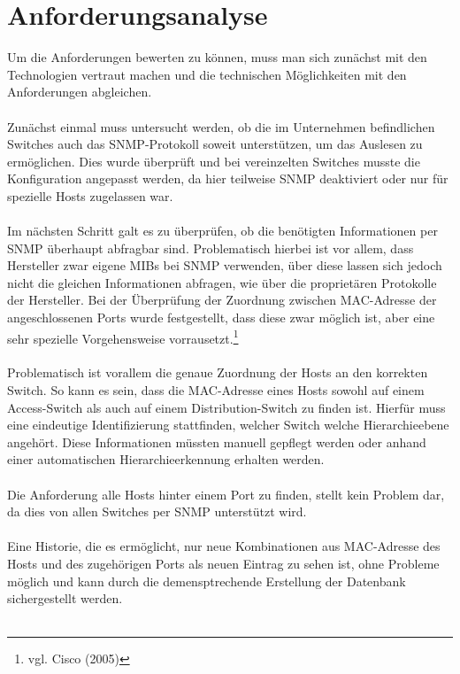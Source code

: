\section{Anforderungsanalyse}
\label{sec:anfanalyse}

Um die Anforderungen bewerten zu können, muss man sich zunächst mit den Technologien vertraut machen und die technischen Möglichkeiten mit den Anforderungen abgleichen.\\\\
Zunächst einmal muss untersucht werden, ob die im Unternehmen befindlichen Switches auch das SNMP-Protokoll soweit unterstützen, um das Auslesen zu ermöglichen.
Dies wurde überprüft und bei vereinzelten Switches musste die Konfiguration angepasst werden, da hier teilweise SNMP deaktiviert oder nur für spezielle Hosts zugelassen war.\\\\
Im nächsten Schritt galt es zu überprüfen, ob die benötigten Informationen per SNMP überhaupt abfragbar sind. Problematisch hierbei ist vor allem, dass Hersteller zwar eigene MIBs bei SNMP verwenden, über diese lassen sich jedoch nicht die gleichen Informationen abfragen, wie über die proprietären Protokolle der Hersteller.
Bei der Überprüfung der Zuordnung zwischen MAC-Adresse der angeschlossenen Ports wurde festgestellt, dass diese zwar möglich ist, aber eine sehr spezielle Vorgehensweise vorrausetzt.\footnote{vgl. Cisco (2005)}\\\\
Problematisch ist vorallem die genaue Zuordnung der Hosts an den korrekten Switch. So kann es sein, dass die MAC-Adresse eines Hosts sowohl auf einem Access-Switch als auch auf einem Distribution-Switch zu finden ist.
Hierfür muss eine eindeutige Identifizierung stattfinden, welcher Switch welche Hierarchieebene angehört. Diese Informationen müssten manuell gepflegt werden oder anhand einer automatischen Hierarchieerkennung erhalten werden.\\\\
Die Anforderung alle Hosts hinter einem Port zu finden, stellt kein Problem dar, da dies von allen Switches per SNMP unterstützt wird.\\\\
Eine Historie, die es ermöglicht, nur neue Kombinationen aus MAC-Adresse des Hosts und des zugehörigen Ports als neuen Eintrag zu sehen ist, ohne Probleme möglich und kann durch die demensptrechende Erstellung der Datenbank sichergestellt werden.\\\\

